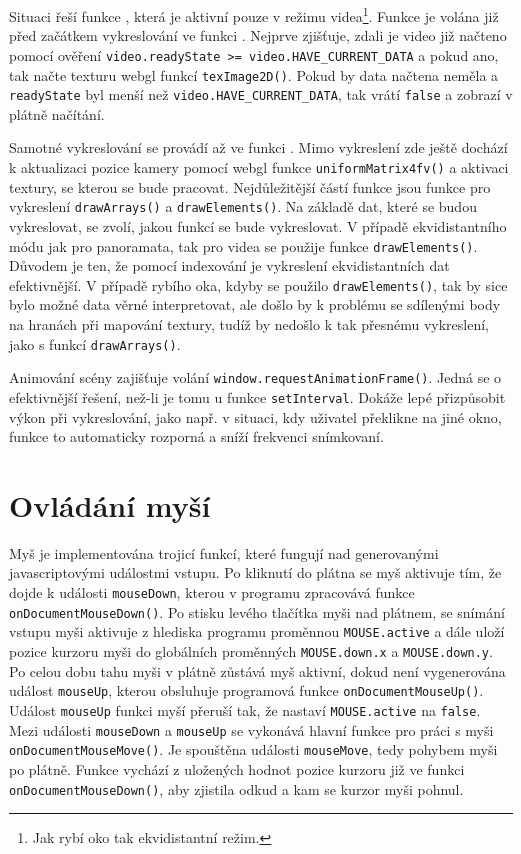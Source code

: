 Situaci řeší funkce \texttt{\updateTexture}, která je aktivní pouze v režimu videa\footnote{Jak rybí oko tak ekvidistantní režim.}. Funkce je volána již před začátkem vykreslování ve funkci \texttt{\render}. Nejprve zjišťuje, zdali je video již načteno pomocí ověření \texttt{video.readyState >= video.HAVE\_CURRENT\_DATA} a pokud ano, tak načte texturu webgl funkcí \texttt{texImage2D()}. Pokud by data načtena neměla a \texttt{readyState} byl menší než \texttt{video.HAVE\_CURRENT\_DATA}, tak vrátí \texttt{false} a zobrazí  v plátně načítání.


Samotné vykreslování se provádí až ve funkci \texttt{\render}. Mimo vykreslení zde ještě dochází k aktualizaci pozice kamery pomocí webgl funkce \texttt{uniformMatrix4fv()} a aktivaci textury, se kterou se bude pracovat. Nejdůležitější částí funkce \texttt{\render} jsou funkce pro vykreslení \texttt{drawArrays()} a \texttt{drawElements()}. Na základě dat, které se budou vykreslovat, se zvolí, jakou funkcí se bude vykreslovat. V případě ekvidistantního módu jak pro panoramata, tak pro videa se použije funkce  \texttt{drawElements()}. Důvodem je ten, že pomocí indexování je vykreslení ekvidistantních dat efektivnější. V případě rybího oka, kdyby se použilo \texttt{drawElements()}, tak by sice bylo možné data věrné interpretovat, ale došlo by k problému se sdílenými body na hranách při mapování textury, tudíž by nedošlo k tak přesnému vykreslení, jako s funkcí \texttt{drawArrays()}.

Animování scény zajišťuje volání \texttt{window.requestAnimationFrame()}. Jedná se o efektivnější řešení, než-li je tomu u funkce \texttt{setInterval}. Dokáže lepé přizpůsobit výkon při vykreslování, jako např. v situaci, kdy uživatel překlikne na jiné okno, funkce to automaticky rozporná a sníží frekvenci snímkovaní.



\section{Ovládání myší}
Myš je implementována trojicí funkcí, které fungují nad generovanými javascriptovými událostmi vstupu. Po kliknutí do plátna se myš aktivuje tím, že dojde k události \texttt{mouseDown}, kterou v programu zpracovává funkce \texttt{onDocumentMouseDown()}. Po stisku levého tlačítka myši nad plátnem, se snímání vstupu myši aktivuje z hlediska programu proměnnou \texttt{MOUSE.active} a dále uloží pozice kurzoru myši do globálních proměnných \texttt{MOUSE.down.x} a \texttt{MOUSE.down.y}. Po celou dobu tahu myši v plátně zůstává myš aktivní, dokud není vygenerována událost \texttt{mouseUp}, kterou obsluhuje programová funkce \texttt{onDocumentMouseUp()}. Událost \texttt{mouseUp} funkci myší přeruší tak, že nastaví \texttt{MOUSE.active} na \texttt{false}. Mezi události \texttt{mouseDown} a \texttt{mouseUp} se vykonává hlavní funkce pro práci s myši \texttt{onDocumentMouseMove()}. Je spouštěna události \texttt{mouseMove}, tedy pohybem myši po plátně. Funkce vychází z uložených hodnot pozice kurzoru již ve funkci \texttt{onDocumentMouseDown()}, aby zjistila odkud a kam se kurzor myši pohnul. 

